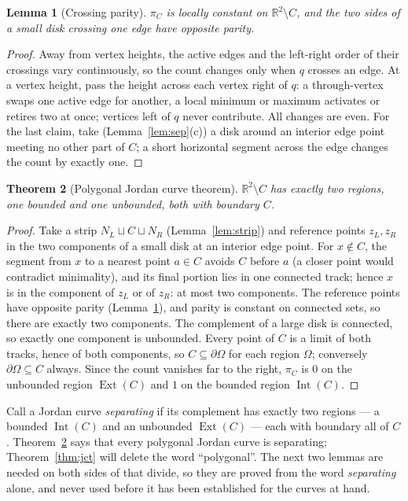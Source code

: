 \documentclass[11pt,a4paper]{article}
\theoremstyle{jsplain}
\newtheorem{theorem}{Theorem}[section]
\newtheorem{lemma}[theorem]{Lemma}
\theoremstyle{jsdefn}
\newcommand{\Int}{\operatorname{Int}}
\newcommand{\Ext}{\operatorname{Ext}}
\begin{document}
\begin{lemma}[Crossing parity]\label{lem:parity}
$\pi_C$ is locally constant on $\mathbb R^2\setminus C$, and the two
sides of a small disk crossing one edge have opposite parity.
\end{lemma}
\begin{proof}
Away from vertex heights, the active edges and the left-right order of
their crossings vary continuously, so the count changes only when $q$
crosses an edge. At a vertex height, pass the height across each
vertex right of $q$: a through-vertex swaps one active edge for
another, a local minimum or maximum activates or retires two at once;
vertices left of $q$ never contribute. All changes are even. For the
last claim, take (Lemma~\ref{lem:sep}(c)) a disk around an interior
edge point meeting no other part of $C$; a short horizontal segment
across the edge changes the count by exactly one.
\end{proof}

\begin{theorem}[Polygonal Jordan curve theorem]\label{thm:pjct}
$\mathbb R^2\setminus C$ has exactly two regions, one bounded and one
unbounded, both with boundary $C$.
\end{theorem}
\begin{proof}
Take a strip $N_L\sqcup C\sqcup N_R$ (Lemma~\ref{lem:strip}) and
reference points $z_L,z_R$ in the two components of a small disk at an
interior edge point. For $x\notin C$, the segment from $x$ to a
nearest point $a\in C$ avoids $C$ before $a$ (a closer point would
contradict minimality), and its final portion lies in one connected
track; hence $x$ is in the component of $z_L$ or of $z_R$: at most two
components. The reference points have opposite parity
(Lemma~\ref{lem:parity}), and parity is constant on connected sets, so
there are exactly two components. The complement of a large disk is
connected, so exactly one component is unbounded. Every point of $C$
is a limit of both tracks, hence of both components, so
$C\subseteq\partial\Omega$ for each region $\Omega$; conversely
$\partial\Omega\subseteq C$ always. Since the count vanishes far to
the right, $\pi_C$ is $0$ on the unbounded region
$\Ext(C)$ and $1$ on the bounded region $\Int(C)$.
\end{proof}

Call a Jordan curve \emph{separating} if its complement has exactly two
regions --- a bounded $\Int(C)$ and an unbounded $\Ext(C)$ --- each with
boundary all of $C$. Theorem~\ref{thm:pjct} says that every polygonal
Jordan curve is separating; Theorem~\ref{thm:jct} will delete the word
``polygonal''. The next two lemmas are needed on both sides of that
divide, so they are proved from the word \emph{separating} alone, and
never used before it has been established for the curves at hand.
\end{document}
